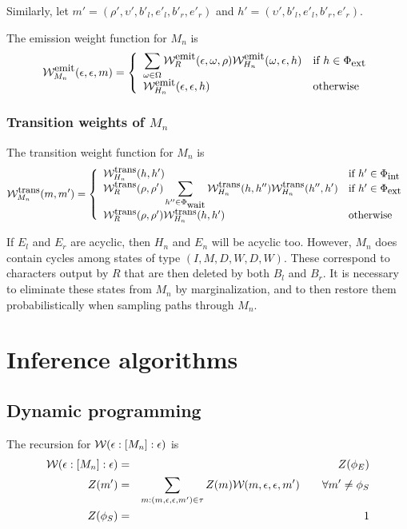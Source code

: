 \documentclass{article}
\newcommand{\seclabel}[1]{\label{sec.#1}}
\newcommand\wtrans[4]{#1(#2 : [#3] : #4)}
\newcommand\States{\Phi}
\newcommand\statesof[1]{\States_{#1}}
\newcommand\Transitions{\tau}
\newcommand\startstate{\phi_S}
\newcommand\laststate{\phi_E}
\newcommand\weight{{\cal W}}
\newcommand\weightfunof[1]{\weight_{#1}}
\newcommand\transweightfun[1]{\weightfunof{#1}^{\mbox{\small trans}}}
\newcommand\emitweightfun[1]{\weightfunof{#1}^{\mbox{\small emit}}}
\newcommand\stateset[1]{\statesof{\mbox{\small #1}}}
\newcommand\hstatedest{(\upsilon',b'_l,e'_l,b'_r,e'_r)}
\newcommand\externalsuffix{ext}
\newcommand\internalsuffix{int}
\newcommand\waitsuffix{wait}
\newcommand\externalcascades{\stateset{\externalsuffix}}
\newcommand\internalcascades{\stateset{\internalsuffix}}
\newcommand\waitstates{\stateset{\waitsuffix}}
\newcommand\mstatedest{(\rho',\upsilon',b'_l,e'_l,b'_r,e'_r)}
\begin{document}
Similarly, let $m' = \mstatedest$ and $h' = \hstatedest$.

The emission weight function for $M_n$ is
\[
\emitweightfun{M_n}(\epsilon,\epsilon,m) = \left\{
\begin{array}{ll}
\displaystyle
\sum_{\omega \in \Omega} \emitweightfun{R}(\epsilon,\omega,\rho) \emitweightfun{H_n}(\omega,\epsilon,h)
 & \mbox{if $h \in \externalcascades$} \\
\emitweightfun{H_n}(\epsilon,\epsilon,h)
 & \mbox{otherwise}
\end{array}
\right.
\]

\subsubsection{Transition weights of $M_n$}
The transition weight function for $M_n$ is
\[
\transweightfun{M_n}(m,m') = \left\{
\begin{array}{ll}
\displaystyle
\transweightfun{H_n}(h,h')
 & \mbox{if $h' \in \internalcascades$} \\
\displaystyle
\transweightfun{R}(\rho,\rho') \sum_{h'' \in \waitstates} \transweightfun{H_n}(h,h'') \transweightfun{H_n}(h'',h')
 & \mbox{if $h' \in \externalcascades$} \\
\transweightfun{R}(\rho,\rho') \transweightfun{H_n}(h,h')
 & \mbox{otherwise}
\end{array}
\right.
\]

If $E_l$ and $E_r$ are acyclic, then $H_n$ and $E_n$ will be acyclic too.
However, $M_n$ does contain cycles among states of type $(I,M,D,W,D,W)$.
These correspond to characters output by $R$ that are then deleted by both $B_l$ and $B_r$.
It is necessary to eliminate these states from $M_n$ by marginalization, and to then restore them probabilistically when sampling paths through $M_n$.

\section{Inference algorithms}

\subsection{Dynamic programming}
\seclabel{DynamicProgramming}
The recursion for $\wtrans{\weight}{\epsilon}{M_n}{\epsilon}$ is
\begin{eqnarray*}
\wtrans{\weight}{\epsilon}{M_n}{\epsilon} & = & Z(\laststate) \\
Z(m') & = & \sum_{m : (m,\epsilon,\epsilon,m') \in \Transitions} Z(m) \weightfunof{}(m,\epsilon,\epsilon,m')  \quad\quad \forall m' \neq \startstate \\
Z(\startstate) & = & 1
\end{eqnarray*}
\end{document}
